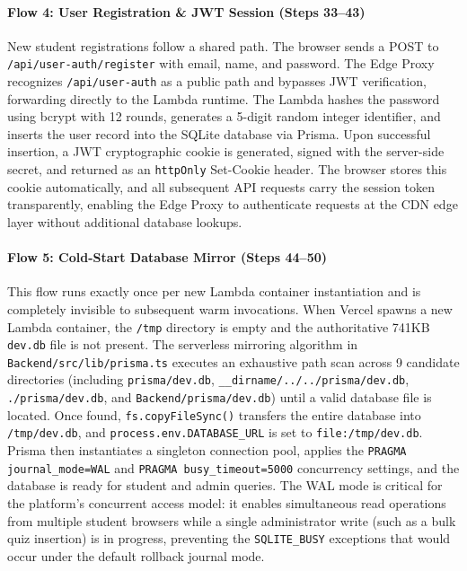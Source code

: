 \documentclass[12pt,a4paper]{article}
\begin{document}
\paragraph{Flow 4: User Registration \& JWT Session (Steps 33--43)}
New student registrations follow a shared path. The browser sends a POST to \texttt{/api/user-auth/register} with email, name, and password. The Edge Proxy recognizes \texttt{/api/user-auth} as a public path and bypasses JWT verification, forwarding directly to the Lambda runtime. The Lambda hashes the password using bcrypt with 12 rounds, generates a 5-digit random integer identifier, and inserts the user record into the SQLite database via Prisma. Upon successful insertion, a JWT cryptographic cookie is generated, signed with the server-side secret, and returned as an \texttt{httpOnly} Set-Cookie header. The browser stores this cookie automatically, and all subsequent API requests carry the session token transparently, enabling the Edge Proxy to authenticate requests at the CDN edge layer without additional database lookups.

\paragraph{Flow 5: Cold-Start Database Mirror (Steps 44--50)}
This flow runs exactly once per new Lambda container instantiation and is completely invisible to subsequent warm invocations. When Vercel spawns a new Lambda container, the \texttt{/tmp} directory is empty and the authoritative 741KB \texttt{dev.db} file is not present. The serverless mirroring algorithm in \texttt{Backend/src/lib/prisma.ts} executes an exhaustive path scan across 9 candidate directories (including \texttt{prisma/dev.db}, \texttt{\_\_dirname/../../prisma/dev.db}, \texttt{./prisma/dev.db}, and \texttt{Backend/prisma/dev.db}) until a valid database file is located. Once found, \texttt{fs.copyFileSync()} transfers the entire database into \texttt{/tmp/dev.db}, and \texttt{process.env.DATABASE\_URL} is set to \texttt{file:/tmp/dev.db}. Prisma then instantiates a singleton connection pool, applies the \texttt{PRAGMA journal\_mode=WAL} and \texttt{PRAGMA busy\_timeout=5000} concurrency settings, and the database is ready for student and admin queries. The WAL mode is critical for the platform's concurrent access model: it enables simultaneous read operations from multiple student browsers while a single administrator write (such as a bulk quiz insertion) is in progress, preventing the \texttt{SQLITE\_BUSY} exceptions that would occur under the default rollback journal mode.
\end{document}

